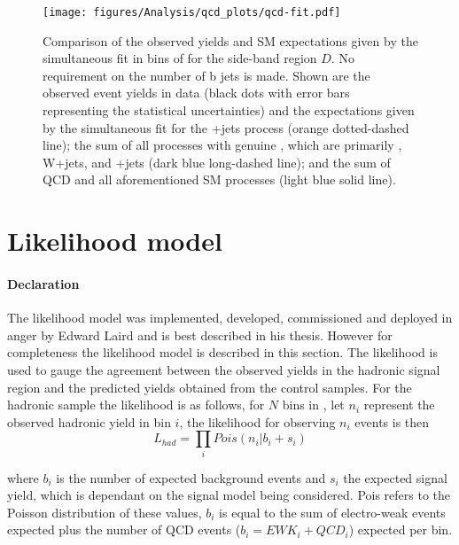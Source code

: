 \begin{figure}[!h]
  \begin{center}
    \texttt{[image: figures/Analysis/qcd\_plots/qcd-fit.pdf]}
    \caption{Comparison of the observed yields and SM expectations
      given by the simultaneous fit in bins of \HT for the
      side-band region $D$. No requirement on the number of b jets is
      made. Shown are the observed event yields in data (black dots
      with error bars representing the statistical uncertainties) and
      the expectations given by the simultaneous fit for the
      \HepProcess{\PZ\to\nu\nu}+jets process (orange dotted-dashed line); the 
      sum of all processes with genuine \MET, which are primarily 
      \HepProcess{\Ptop\APtop}, W+jets, and \HepProcess{\PZ\to\nu\nu}+jets
      (dark blue long-dashed line); and the sum of QCD and all aforementioned 
      SM processes (light blue solid line).\cite{CMS-AN-11-517}}
    \label{fig:qcd-fit}
  \end{center}
\end{figure}




\section{Likelihood model} %
\label{sec:likelihood_model}
\paragraph{Declaration} %
\label{par:declaration-likelihood}
The likelihood model was implemented, developed, commissioned and deployed in 
anger by Edward Laird and is best described in his thesis\cite{ted}. However 
for completeness the likelihood model is described in this section.
The likelihood is used to gauge the agreement between the observed yields in 
the hadronic signal region and the predicted yields obtained from the control 
samples.
For the hadronic sample the likelihood is as follows, for $N$ bins in \HT, let 
$n_{i}$ represent the observed hadronic yield in \HT bin $i$, the likelihood 
for observing $n_{i}$ events is then
\begin{equation}
  L_{had} = \prod_{i}Pois\left(n_{i}|b_{i}+s_{i}\right)
\label{eqn:l_had}
\end{equation}

where $b_{i}$ is the number of expected background events and $s_{i}$ the 
expected signal yield, which is dependant on the signal model being considered.
Pois refers to the Poisson distribution of these values, $b_{i}$ is equal to 
the sum of electro-weak events expected plus the number of QCD events ($b_{i} = 
EWK_{i}+QCD_{i}$) expected per bin.


